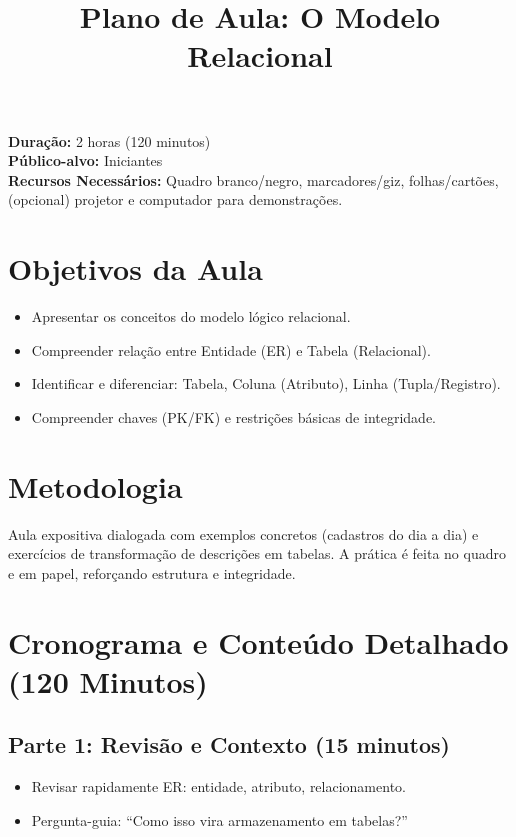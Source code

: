 \documentclass[12pt,a4paper]{article}
\title{Plano de Aula: O Modelo Relacional}
\date{}
\begin{document}
\maketitle

\noindent
\textbf{Duração:} 2 horas (120 minutos)\\
\textbf{Público-alvo:} Iniciantes\\
\textbf{Recursos Necessários:} Quadro branco/negro, marcadores/giz, folhas/cartões, (opcional) projetor e computador para demonstrações.

\section{Objetivos da Aula}
\begin{itemize}[leftmargin=*,itemsep=0.25em]
  \item Apresentar os conceitos do modelo lógico relacional.
  \item Compreender relação entre Entidade (ER) e Tabela (Relacional).
  \item Identificar e diferenciar: Tabela, Coluna (Atributo), Linha (Tupla/Registro).
  \item Compreender chaves (PK/FK) e restrições básicas de integridade.
\end{itemize}

\section{Metodologia}
Aula expositiva dialogada com exemplos concretos (cadastros do dia a dia) e exercícios de transformação de descrições em tabelas. A prática é feita no quadro e em papel, reforçando estrutura e integridade.

\section{Cronograma e Conteúdo Detalhado (120 Minutos)}
\subsection*{Parte 1: Revisão e Contexto (15 minutos)}
\begin{itemize}[leftmargin=*,itemsep=0.35em]
  \item Revisar rapidamente ER: entidade, atributo, relacionamento.
  \item Pergunta-guia: ``Como isso vira armazenamento em tabelas?''
\end{itemize}
\end{document}
